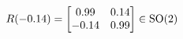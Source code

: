 \documentclass[preview]{standalone}
\begin{document}
\begin{align*}
\special{dvisvgm:raw <g id='unique000'>}R(-0.14) = \begin{bmatrix} 0.99 & 0.14 \\ -0.14 & 0.99 \end{bmatrix} \in \text{SO}(2)\special{dvisvgm:raw </g>}
\end{align*}
\end{document}
